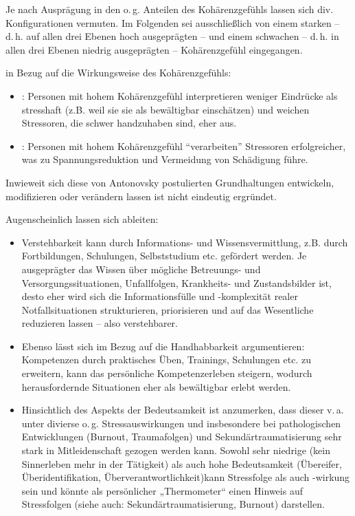 Je nach Ausprägung in den o.\,g. Anteilen des
Kohärenzgefühls lassen sich div. Konfigurationen vermuten.
Im Folgenden sei ausschließlich von einem starken -- d.\,h. auf allen drei Ebenen hoch ausgeprägten -- und einem schwachen -- d.\,h. in
allen drei Ebenen niedrig ausgeprägten -- Kohärenzgefühl
eingegangen.

 in Bezug auf die Wirkungsweise des
Kohärenzgefühls:
\begin{itemize}
  \item {}:
  Personen mit hohem Kohärenzgefühl interpretieren weniger
  Eindrücke als stresshaft (z.B. weil sie sie als bewältigbar einschätzen) und weichen Stressoren, die schwer
  handzuhaben sind, eher aus.
  \item {}: Personen
  mit hohem Kohärenzgefühl \enquote{verarbeiten} Stressoren erfolgreicher, was zu
  Spannungsreduktion und Vermeidung von Schädigung führe.
\end{itemize}
Inwieweit sich diese von Antonovsky postulierten
Grundhaltungen entwickeln, modifizieren oder verändern
lassen ist nicht eindeutig ergründet.

Augenscheinlich lassen sich  ableiten:

\begin{itemize}
  \item Verstehbarkeit kann durch Informations- und
  Wissensvermittlung, z.B. durch Fortbildungen, Schulungen,
  Selbststudium etc. gefördert werden. Je ausgeprägter das
  Wissen über mögliche Betreuungs- und
  Versorgungssituationen, Unfallfolgen, Krankheits- und
  Zustandsbilder ist, desto eher wird sich die
  Informationsfülle und -komplexität realer Notfallsituationen strukturieren,
  priorisieren und auf das Wesentliche reduzieren lassen --
  also verstehbarer.
  
  \item Ebenso lässt sich im Bezug auf die Handhabbarkeit
  argumentieren: Kompetenzen durch praktisches Üben,
  Trainings, Schulungen etc. zu erweitern, kann das
  persönliche Kompetenzerleben steigern, wodurch herausfordernde
  Situationen eher als bewältigbar erlebt werden.
  
  \item Hinsichtlich des Aspekts der Bedeutsamkeit ist
  anzumerken, dass dieser v.\,a. unter divierse o.\,g.
  Stressauswirkungen und insbesondere bei pathologischen
  Entwicklungen (Burnout, Traumafolgen) und
  Sekundärtraumatisierung sehr stark in Mitleidenschaft
  gezogen werden kann. Sowohl sehr niedrige (kein
  Sinnerleben mehr in der Tätigkeit) als auch hohe
  Bedeutsamkeit (Übereifer, Überidentifikation,
  Überverantwortlichkeit)kann Stressfolge als auch -wirkung
  sein und könnte als persönlicher „Thermometer“ einen
  Hinweis auf Stressfolgen (siehe auch:
  Sekundärtraumatisierung, Burnout) darstellen.
\end{itemize}

